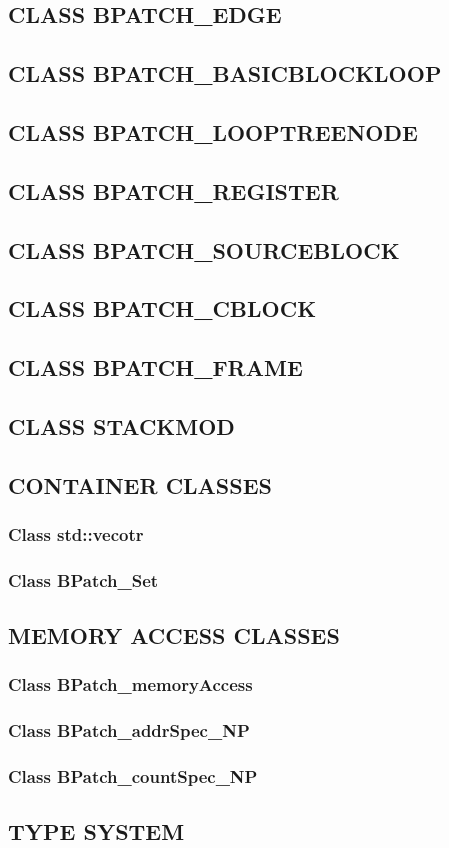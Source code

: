 \subsection{CLASS BPATCH\_EDGE}
\subsection{CLASS BPATCH\_BASICBLOCKLOOP}
\subsection{CLASS BPATCH\_LOOPTREENODE}
\subsection{CLASS BPATCH\_REGISTER}
\subsection{CLASS BPATCH\_SOURCEBLOCK}
\subsection{CLASS BPATCH\_CBLOCK}
\subsection{CLASS BPATCH\_FRAME}
\subsection{CLASS STACKMOD}
\subsection{CONTAINER CLASSES}
\subsubsection{Class std::vecotr}
\subsubsection{Class BPatch\_Set}
\subsection{MEMORY ACCESS CLASSES}
\subsubsection{Class BPatch\_memoryAccess}
\subsubsection{Class BPatch\_addrSpec\_NP}
\subsubsection{Class BPatch\_countSpec\_NP}
\subsection{TYPE SYSTEM}\label{sec:type_system}

\pagebreak
